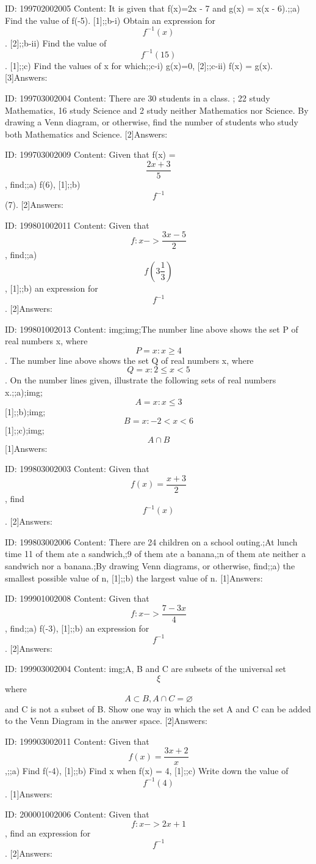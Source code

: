 \documentclass{article}
\begin{document}
ID: 199702002005
Content:
It is given that f(x)=2x - 7 and g(x) = x(x - 6).;;a) Find the value of f(-5). [1];;b-i) Obtain an expression for $$f^{-1}(x)$$. [2];;b-ii) Find the value of $$f^{-1}(15)$$. [1];;c) Find the values of x for which;;c-i) g(x)=0, [2];;c-ii) f(x) = g(x). [3]Answers:

ID: 199703002004
Content:
There are 30 students in a class. ; 22 study Mathematics, 16 study Science and 2 study neither Mathematics nor Science. By drawing a Venn diagram, or otherwise, find the number of students who study both Mathematics and Science. [2]Answers:

ID: 199703002009
Content:
Given that f(x) =$$\frac{2x+3}{5}$$, find;;a) f(6), [1];;b) $$f^{-1}$$(7). [2]Answers:

ID: 199801002011
Content:
Given that  $$f:x->\frac{3x-5}{2}$$, find;;a) $$f(3\frac{1}{3})$$, [1];;b) an expression for $$f^{-1}$$. [2]Answers:

ID: 199801002013
Content:
img;img;The number line above shows the set P of real numbers x, where $$P={x:x \geq 4}$$. The number line above shows the set Q of real numbers x, where $$Q={x:2\leq x<5}$$. On the number lines given, illustrate the following sets of real numbers x.;;a);img;$$A={x:x\leq3}$$ [1];;b);img;$$B={x:-2<x<6}$$ [1];;c);img;$$A \cap B$$ [1]Answers:

ID: 199803002003
Content:
Given that $$f(x) = \frac{x+3}{2}$$, find $$f^{-1}(x)$$. [2]Answers:

ID: 199803002006
Content:
There are 24 children on a school outing.;At lunch time 11 of them ate a sandwich,;9 of them ate a banana,;n of them ate neither a sandwich nor a banana.;By drawing Venn diagrams, or otherwise, find;;a) the smallest possible value of n, [1];;b) the largest value of n. [1]Answers:

ID: 199901002008
Content:
Given that $$f:x->\frac{7-3x}{4}$$, find;;a) f(-3), [1];;b) an expression for $$f^{-1}$$. [2]Answers:

ID: 199903002004
Content:
img;A, B and C are subsets of the universal set $$\xi$$ where $$A \subset B, A \cap C = \varnothing$$ and C is not a subset of B. Show one way in which the set A and C can be added to the Venn Diagram in the answer space. [2]Answers:

ID: 199903002011
Content:
Given that $$f(x) = \frac{3x+2}{x}$$,;;a) Find f(-4), [1];;b) Find x when f(x) = 4, [1];;c) Write down the value of $$f^{-1}(4)$$. [1]Answers:

ID: 200001002006
Content:
Given that $$f:x->2x+1$$, find an expression for $$f^{-1}$$. [2]Answers:
\end{document}
